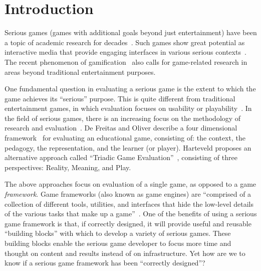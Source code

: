 \documentclass{sigchi}
\begin{document}

\section{Introduction}

Serious games (games with additional goals beyond just entertainment) have been a topic
of academic research for decades~\cite{Zyda2005}. Such games show great potential as
interactive media that provide engaging interfaces in various serious
contexts~\cite{mcgonigal2011reality,reeves2009total}. The recent phenomenon of
gamification~\cite{Deterding2011mt} also calls for game-related research in areas beyond
traditional entertainment purposes.

One fundamental question in evaluating a serious game is the extent to which the
game achieves its ``serious'' purpose.  This is quite different from 
traditional entertainment games, in which evaluation focuses on usability or
playability~\cite{song2007new}. In the field of serious games, there is an increasing
focus on the methodology of research and evaluation~\cite{Mayer2012233}. De Freitas and
Oliver describe a four dimensional framework~\cite{de2006can} for evaluating an
educational game, consisting of: the context, the pedagogy, the representation, and the
learner (or player). Harteveld proposes an alternative approach called ``Triadic Game
Evaluation''~\cite{harteveld2010triadic}, consisting of three perspectives: Reality,
Meaning, and Play.

The above approaches focus on evaluation of a single game, as opposed to a game {\em
  framework}. Game frameworks (also known as game engines) are ``comprised of a collection
of different tools, utilities, and interfaces that hide the low-level details of the
various tasks that make up a game''~\cite{sherrod2006ultimate}. One of the benefits of
using a serious game framework is that, if correctly designed, it will provide useful and
reusable ``building blocks'' with which to develop a variety of serious games.  These
building blocks enable the serious game developer to focus more time and thought on
content and results instead of on infrastructure. Yet how are we to know if a serious
game framework has been ``correctly designed''?
\end{document}
